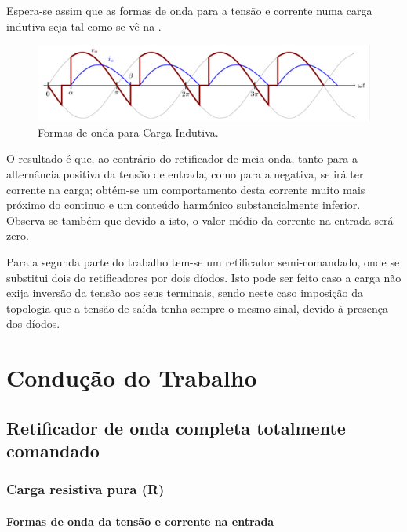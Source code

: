\documentclass[a4paper,11pt]{article}
\numberwithin{equation}{section}
\begin{document}
Espera-se assim que as formas de onda para a tensão e corrente numa carga indutiva seja tal como se vê na .

\begin{figure}[h]
	\centering
	\includegraphics[keepaspectratio=true, scale=0.8]{img/andamento.png}
	\caption{Formas de onda para Carga Indutiva.}
	\label{fig:andamento}
	\vspace{-0.8em}
\end{figure}

O resultado é que, ao contrário do retificador de meia onda, tanto para a alternância positiva da tensão de entrada, como para a negativa, se irá ter corrente na carga; obtém-se um comportamento desta corrente muito mais próximo do continuo e um conteúdo harmónico substancialmente inferior. Observa-se também que devido a isto, o valor médio da corrente na entrada será zero.

Para a segunda parte do trabalho tem-se um retificador semi-comandado, onde se substitui dois do retificadores por dois díodos. Isto pode ser feito caso a carga não exija inversão da tensão aos seus terminais, sendo neste caso imposição da topologia que a tensão de saída tenha sempre o mesmo sinal, devido à presença dos díodos.


\section{Condução do Trabalho}

\subsection{Retificador de onda completa totalmente comandado}

\subsubsection{Carga resistiva pura (R)}

\paragraph{Formas de onda da tensão e corrente na entrada}
\end{document}

